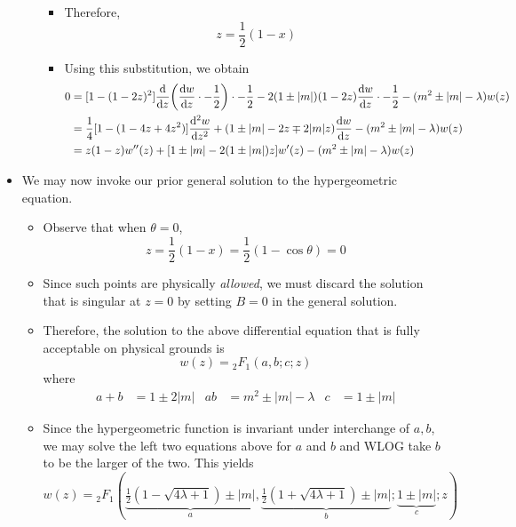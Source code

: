 \documentclass[../finalProject.tex]{subfiles}
\begin{document}
\begin{itemize}
\begin{itemize}
\begin{itemize}
            \item Therefore,
            \begin{equation*}
                z = \frac{1}{2}(1-x)
            \end{equation*}
            \item Using this substitution, we obtain
            \begin{align*}
                0 &= [1-(1-2z)^2]\dv{z}(\dv{w}{z}\cdot -\frac{1}{2})\cdot -\frac{1}{2}-2(1\pm|m|)(1-2z)\dv{w}{z}\cdot -\frac{1}{2}-(m^2\pm|m|-\lambda)w(z)\\
                &= \frac{1}{4}[1-(1-4z+4z^2)]\dv[2]{w}{z}+(1\pm|m|-2z\mp 2|m|z)\dv{w}{z}-(m^2\pm|m|-\lambda)w(z)\\
                &= z(1-z)w''(z)+[1\pm|m|-2(1\pm|m|)z]w'(z)-(m^2\pm|m|-\lambda)w(z)
            \end{align*}
        \end{itemize}
    \end{itemize}
    \item We may now invoke our prior general solution to the hypergeometric equation.
    \begin{itemize}
        \item Observe that when $\theta=0$,
        \begin{equation*}
            z = \frac{1}{2}(1-x)
            = \frac{1}{2}(1-\cos\theta)
            = 0
        \end{equation*}
        \item Since such points are physically \emph{allowed}, we must discard the solution that is singular at $z=0$ by setting $B=0$ in the general solution.
        \item Therefore, the solution to the above differential equation that is fully acceptable on physical grounds is
        \begin{equation*}
            w(z) = {}_2F_1(a,b;c;z)
        \end{equation*}
        where
        \begin{align*}
            a+b &= 1\pm 2|m|&
            ab &= m^2\pm|m|-\lambda&
            c &= 1\pm|m|
        \end{align*}
        \item Since the hypergeometric function is invariant under interchange of $a,b$, we may solve the left two equations above for $a$ and $b$ and WLOG take $b$ to be the larger of the two. This yields
        \begin{equation*}
            w(z) = {}_2F_1(\underbrace{\tfrac{1}{2}(1-\sqrt{4\lambda+1})\pm|m|}_a,\underbrace{\tfrac{1}{2}(1+\sqrt{4\lambda+1})\pm|m|}_b;\underbrace{1\pm|m|}_c;z)

\end{equation*}
\end{itemize}
\end{itemize}
\end{document}
